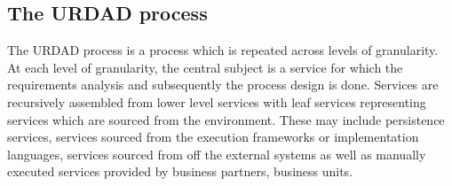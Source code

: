 \subsection{The URDAD process}
\label{sec:urdadProcess}

The URDAD process is a process which is repeated across levels of granularity. At each level of granularity, the central subject is a service for which the requirements analysis and subsequently the process design is done. Services are recursively assembled from lower level services with leaf services representing services which are sourced from the environment. These may include persistence services, services sourced from the execution frameworks or implementation languages, services sourced from off the external systems as well as manually executed services provided by business partners, business units.

